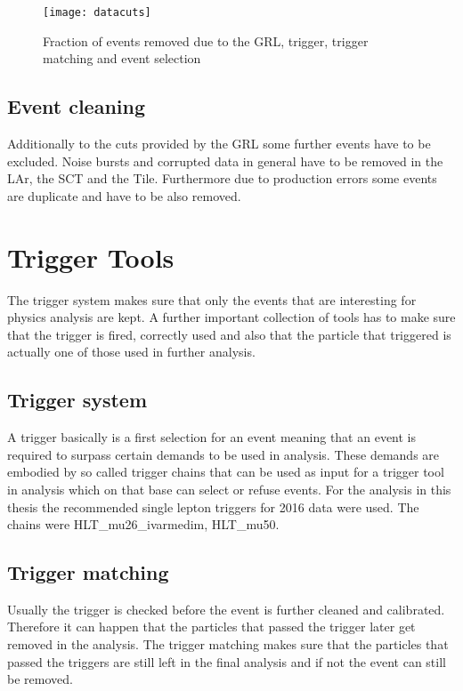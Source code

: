 \begin{figure}[h]
\centering
\texttt{[image: datacuts]}
\caption{Fraction of events removed due to the GRL, trigger, trigger matching and event selection}
\label{fig:datacuts}
\end{figure}



\subsection{Event cleaning}

Additionally to the cuts provided by the GRL some further events have to be excluded. Noise bursts and corrupted data in general have to be removed in the LAr, the SCT and the Tile. Furthermore due to production errors some events are duplicate and have to be also removed. 


\section{Trigger Tools}

The trigger system makes sure that only the events that are interesting for physics analysis are kept.
A further important collection of tools has to make sure that the trigger is fired, correctly used and also that the particle that triggered is actually one of those used in further analysis.


\subsection{Trigger system}


A trigger basically is a first selection for an event meaning that an event is required to surpass certain demands to be used in analysis. These demands are embodied by so called trigger chains that can be used as input for a trigger tool in analysis which on that base can select or refuse events. For the analysis in this thesis the recommended single lepton triggers for 2016 data were used. The chains were HLT\_mu26\_ivarmedim, HLT\_mu50.



\subsection{Trigger matching}

Usually the trigger is checked before the event is further cleaned and calibrated. Therefore it can happen that the particles that passed the trigger later get removed in the analysis. The trigger matching makes sure that the particles that passed the triggers are still left in the final analysis and if not the event can still be removed.

